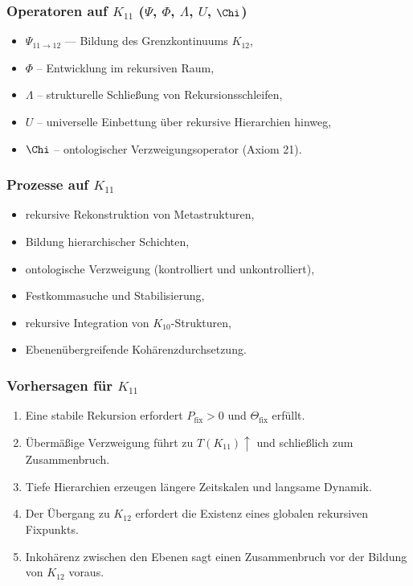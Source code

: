 \subsubsection{Operatoren auf $K_{11}$ ($\Psi$, $\Phi$, $\Lambda$, $U$, $\Chi$)}

\begin{itemize}
    \item $\Psi_{11\to12}$ — Bildung des Grenzkontinuums $K_{12}$,
    \item $\Phi$ – Entwicklung im rekursiven Raum,
    \item $\Lambda$ – strukturelle Schließung von Rekursionsschleifen,
    \item $U$ – universelle Einbettung über rekursive Hierarchien hinweg,
    \item $\Chi$ – ontologischer Verzweigungsoperator (Axiom 21).
\end{itemize}

\subsubsection{Prozesse auf $K_{11}$}

\begin{itemize}
    \item rekursive Rekonstruktion von Metastrukturen,
    \item Bildung hierarchischer Schichten,
    \item ontologische Verzweigung (kontrolliert und unkontrolliert),
    \item Festkommasuche und Stabilisierung,
    \item rekursive Integration von $K_{10}$-Strukturen,
    \item Ebenenübergreifende Kohärenzdurchsetzung.
\end{itemize}

\subsubsection{Vorhersagen für $K_{11}$}

\begin{enumerate}
    \item Eine stabile Rekursion erfordert $P_{\mathrm{fix}}>0$ und $\Theta_{\mathrm{fix}}$ erfüllt.
    \item Übermäßige Verzweigung führt zu $T(K_{11})\uparrow$ und schließlich zum Zusammenbruch.
    \item Tiefe Hierarchien erzeugen längere Zeitskalen und langsame Dynamik.
    \item Der Übergang zu $K_{12}$ erfordert die Existenz eines globalen rekursiven Fixpunkts.
    \item Inkohärenz zwischen den Ebenen sagt einen Zusammenbruch vor der Bildung von $K_{12}$ voraus.
\end{enumerate}

